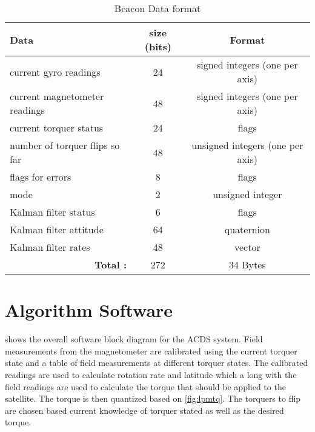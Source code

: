 \begin{table}[H]
    \begin{tabular}{|l|c|c|}
        \hline
        Data&size (bits)&Format\\
        \hline
        current gyro readings&24&signed integers (one per axis)\\
        \hline
        current magnetometer readings&48&signed integers (one per axis)\\
        \hline
        current torquer status&24&flags\\
        \hline
        number of torquer flips so far & 48 & unsigned integers (one per axis)\\
        \hline
        flags for errors& 8 & flags\\
        \hline
        mode&2&unsigned integer\\
        \hline
        Kalman filter status&6&flags\\
        \hline
        Kalman filter attitude&64&quaternion\\
        \hline
        Kalman filter rates&48&vector\\
        \hline
        \multicolumn{1}{|r|}{\bfseries Total :}&272&34 Bytes\\
        \hline
    \end{tabular}
    \caption{Beacon Data format}
    \label{tab:beacondat}
\end{table}

\section{Algorithm Software}

 shows the overall software block diagram for the \ac{ACDS} system. Field measurements from the magnetometer are calibrated using the current torquer state and a table of field measurements at different torquer states. The calibrated readings are used to calculate rotation rate and latitude which a long with the field readings are used to calculate the torque that should be applied to the satellite. The torque is then quantized based on \cref{fig:lpmtq}. The torquers to flip are chosen based current knowledge of torquer stated as well as the desired torque.

